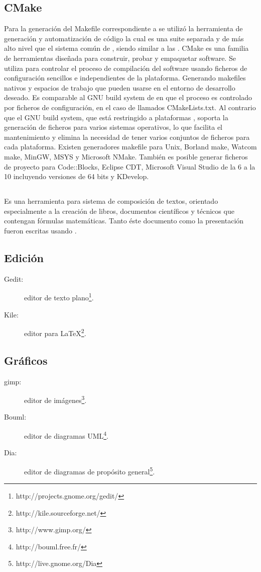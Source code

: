\subsection{CMake}
    Para la generación del Makefile correspondiente a \rc{} se utilizó la herramienta de generación y automatización de código \cmake{} la
cual es una suite separada y de más alto nivel que el sistema \make{} común de \unix{}, siendo similar a las \autotools{}.
CMake es una familia de herramientas diseñada para construir, probar y empaquetar software. Se utiliza para controlar el proceso de
compilación del software usando ficheros de configuración sencillos e independientes de la plataforma. Generando makefiles nativos y
espacios de trabajo que pueden usarse en el entorno de desarrollo deseado. Es comparable al GNU build system de \unix{} en que el proceso es
controlado por ficheros de configuración, en el caso de \cmake{} llamados CMakeLists.txt. Al contrario que el GNU build system, que está
restringido a plataformas \unix{}, \cmake{} soporta la generación de ficheros para varios sistemas operativos, lo que facilita el
mantenimiento y elimina la necesidad de tener varios conjuntos de ficheros para cada plataforma.
Existen generadores makefile para Unix, Borland make, Watcom make, MinGW, MSYS y Microsoft NMake. También es posible generar ficheros de
proyecto para Code::Blocks, Eclipse CDT, Microsoft Visual Studio de la 6 a la 10 incluyendo versiones de 64 bits y KDevelop.

\subsection{\LaTeXe}
Es una herramienta para sistema de composición de textos, orientado especialmente a la creación de libros, documentos científicos y técnicos
que contengan fórmulas matemáticas. Tanto éste documento como la presentación fueron escritas usando \LaTeXe.

\subsection{Edici\'on}
\begin{description}
 \item[Gedit:]  editor de texto plano\footnote{http://projects.gnome.org/gedit/}.
 \item[Kile:]   editor para \LaTeX\footnote{http://kile.sourceforge.net/}.
\end{description}

\subsection{Gráficos}
\begin{description}
  \item[gimp:]  editor de imágenes\footnote{http://www.gimp.org/}.
  \item[Bouml:] editor de diagramas UML\footnote{http://bouml.free.fr/}.
  \item[Dia:]   editor de diagramas de propósito general\footnote{http://live.gnome.org/Dia}.
\end{description}

